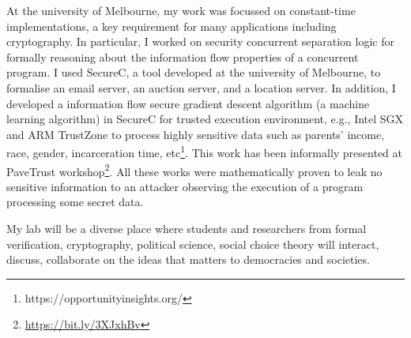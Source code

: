 \documentclass[a4paper]{article}
\begin{document}
At the university of Melbourne, my work was focussed on constant-time implementations, 
a key requirement for many applications including cryptography. 
In particular, I worked on security concurrent separation logic for formally reasoning about 
the information flow properties of a concurrent program. 
I used SecureC, a tool developed at the university of Melbourne, to formalise an email server, 
an auction server, and a location server. 
In addition, I developed a information flow secure gradient descent algorithm (a machine learning 
algorithm) in SecureC for 
trusted execution environment, e.g., Intel SGX and ARM TrustZone to process highly sensitive 
data such as parents' income, race, gender, incarceration time, etc\footnote{https://opportunityinsights.org/}.
This work has been informally presented at PaveTrust workshop\footnote{\url{https://bit.ly/3XJxhBv}}.
All these works were mathematically proven to leak no sensitive 
information to an attacker observing the execution of a program processing 
some secret data.

My lab will be a diverse place where students and researchers from formal 
verification, cryptography, 
political science, social choice theory will interact, discuss, 
collaborate on the ideas that matters to democracies and societies.


 

\end{document}
